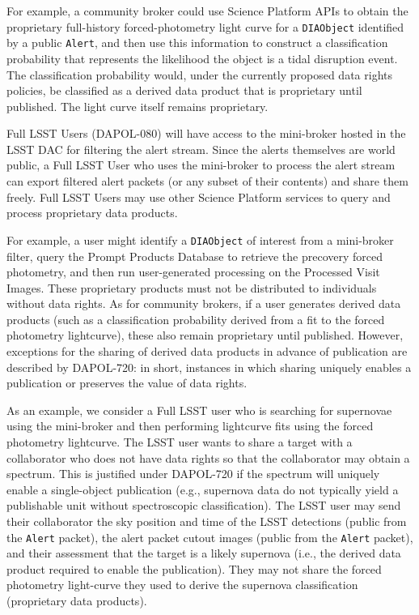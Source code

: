 For example, a community broker could use Science Platform APIs to obtain the proprietary full-history forced-photometry light curve for a \texttt{DIAObject} identified by a public {\tt Alert},
and then use this information to construct a classification probability that represents the likelihood the object is a tidal disruption event.
The classification probability would, under the currently proposed data rights policies, be classified as a derived data product that is proprietary until published. The light curve itself remains proprietary.

Full LSST Users (DAPOL-080) will have access to the mini-broker hosted in the LSST DAC for filtering the alert stream.
Since the alerts themselves are world public, a Full LSST User who uses the mini-broker to process the alert stream can export filtered alert packets (or any subset of their contents) and share them freely.
Full LSST Users may use other Science Platform services to query and process proprietary data products.

For example, a user might identify a \texttt{DIAObject} of interest from a mini-broker filter, query the Prompt Products Database to retrieve the precovery forced photometry, and then run user-generated processing on the Processed Visit Images.
These proprietary products must not be distributed to individuals without data rights.
As for community brokers, if a user generates derived data products (such as a classification probability derived from a fit to the forced photometry lightcurve), these also remain proprietary until published.
However, exceptions for the sharing of derived data products in advance of publication are described by DAPOL-720: in short, instances in which sharing uniquely enables a publication or preserves the value of data rights.

As an example, we consider a Full LSST user who is searching for supernovae using the mini-broker and then performing lightcurve fits using the forced photometry lightcurve.
The LSST user wants to share a target with a collaborator who does not have data rights so that the collaborator may obtain a spectrum.
This is justified under DAPOL-720 if the spectrum will uniquely enable a single-object publication (e.g., supernova data do not typically yield a publishable unit without spectroscopic classification).
The LSST user may send their collaborator the sky position and time of the LSST detections (public from the \texttt{Alert} packet), the alert packet cutout images (public from the \texttt{Alert} packet), and their assessment that the target is a likely supernova (i.e., the derived data product required to enable the publication).
They may not share the forced photometry light-curve they used to derive the supernova classification (proprietary data products).
